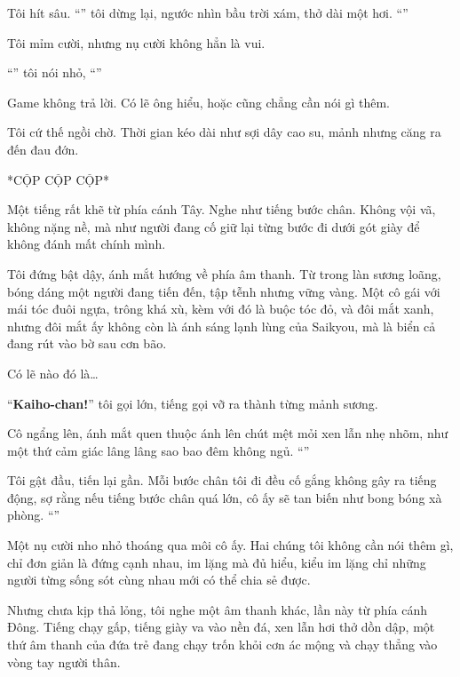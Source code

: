 \documentclass[../main.tex]{subfiles}
\begin{document}
Tôi hít sâu. ``'' tôi dừng lại, ngước nhìn bầu trời xám, thở dài một hơi. ``''

Tôi mỉm cười, nhưng nụ cười không hẳn là vui.

``'' tôi nói nhỏ, ``''

Game không trả lời. Có lẽ ông hiểu, hoặc cũng chẳng cần nói gì thêm.

Tôi cứ thế ngồi chờ. Thời gian kéo dài như sợi dây cao su, mảnh nhưng căng ra đến đau đớn.

*CỘP CỘP CỘP*

Một tiếng rất khẽ từ phía cánh Tây. Nghe như tiếng bước chân. Không vội vã, không nặng nề, mà như người đang cố giữ lại từng bước đi dưới gót giày để không đánh mất chính mình.

Tôi đứng bật dậy, ánh mắt hướng về phía âm thanh. Từ trong làn sương loãng, bóng dáng một người đang tiến đến, tập tễnh nhưng vững vàng. Một cô gái với mái tóc đuôi ngựa, trông khá xù, kèm với đó là buộc tóc đỏ, và đôi mắt xanh, nhưng đôi mắt ấy không còn là ánh sáng lạnh lùng của Saikyou, mà là biển cả đang rút vào bờ sau cơn bão.

Có lẽ nào đó là\dots

``\textbf{Kaiho-chan!}'' tôi gọi lớn, tiếng gọi vỡ ra thành từng mảnh sương.

Cô ngẩng lên, ánh mắt quen thuộc ánh lên chút mệt mỏi xen lẫn nhẹ nhõm, như một thứ cảm giác lâng lâng sao bao đêm không ngủ. ``''

Tôi gật đầu, tiến lại gần. Mỗi bước chân tôi đi đều cố gắng không gây ra tiếng động, sợ rằng nếu tiếng bước chân quá lớn, cô ấy sẽ tan biến như bong bóng xà phòng. ``''

Một nụ cười nho nhỏ thoáng qua môi cô ấy. Hai chúng tôi không cần nói thêm gì, chỉ đơn giản là đứng cạnh nhau, im lặng mà đủ hiểu, kiểu im lặng chỉ những người từng sống sót cùng nhau mới có thể chia sẻ được.

Nhưng chưa kịp thả lỏng, tôi nghe một âm thanh khác, lần này từ phía cánh Đông. Tiếng chạy gấp, tiếng giày va vào nền đá, xen lẫn hơi thở dồn dập, một thứ âm thanh của đứa trẻ đang chạy trốn khỏi cơn ác mộng và chạy thẳng vào vòng tay người thân.
\end{document}

